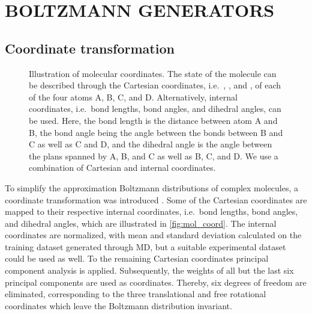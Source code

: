 \documentclass[twoside]{article}
\begin{document}
\section{BOLTZMANN GENERATORS}

\subsection{Coordinate transformation}
\label{sec:coord_transform}

\begin{figure}[h]
	\centering
	\caption{Illustration of molecular coordinates. The state of the molecule can be described through the Cartesian coordinates, i.e.\ , , and , of each of the four atoms A, B, C, and D. Alternatively, internal coordinates, i.e.\ bond lengths, bond angles, and dihedral angles, can be used. Here, the bond length  is the distance between atom A and B, the bond angle  being the angle between the bonds between B and C as well as C and D, and the dihedral angle  is the angle between the plans spanned by A, B, and C as well as B, C, and D. We use a combination of Cartesian and internal coordinates.}
	\label{fig:mol_coord}
\end{figure}

To simplify the approximation Boltzmann distributions of complex molecules, a coordinate transformation was introduced \citep{Noe2019}. Some of the Cartesian coordinates are mapped to their respective internal coordinates, i.e.\ bond lengths, bond angles, and dihedral angles, which are illustrated in \autoref{fig:mol_coord}. The internal coordinates are normalized, with mean and standard deviation calculated on the training dataset generated through MD, but a suitable experimental dataset could be used as well. To the remaining Cartesian coordinates principal component analysis is applied. Subsequently, the weights of all but the last six principal components are used as coordinates. Thereby, six degrees of freedom are eliminated, corresponding to the three translational and free rotational coordinates which leave the Boltzmann distribution invariant.
\end{document}
